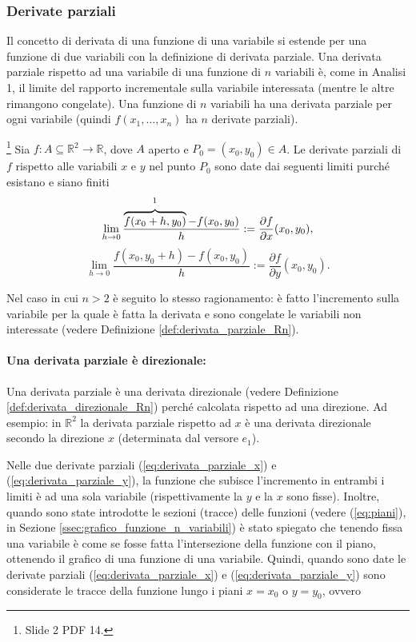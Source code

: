 \subsubsection{Derivate parziali}
Il concetto di derivata di una funzione di una variabile si estende per una funzione di due variabili con la definizione di derivata parziale. Una derivata parziale rispetto ad una variabile di una funzione di $n$ variabili è, come in Analisi 1, il limite del rapporto incrementale sulla variabile interessata (mentre le altre rimangono congelate). Una funzione di $n$ variabili ha una derivata parziale per ogni variabile (quindi $f(x_1,\hdots,x_n)$ ha $n$ derivate parziali).

\begin{definition}[Derivate parziali (caso $n=2$)]\footnote{Slide 2 PDF 14.}
    Sia $f:A\subseteq\mathbb R^2\rightarrow\mathbb R$, dove $A$ aperto e $P_0=(x_0,y_0)\in A$. Le derivate parziali di $f$ rispetto alle variabili $x$ e $y$ nel punto $P_0$ sono date dai seguenti limiti purché esistano e siano finiti
    \begin{equation}\label{eq:derivata_parziale_x}
        \lim\limits_{h\rightarrow 0}\frac{\overbrace{f(x_0+h, y_0)}^{\footnotemark}-f(x_0, y_0)}{h}:=\frac{\partial f}{\partial x}(x_0,y_0),
    \end{equation}
    \begin{equation}\label{eq:derivata_parziale_y}
        \lim\limits_{h\rightarrow 0}\frac{f(x_0, y_0+h)-f(x_0, y_0)}{h}:=\frac{\partial f}{\partial y}(x_0,y_0).
    \end{equation}
\end{definition}

Nel caso in cui $n>2$ è seguito lo stesso ragionamento: è fatto l'incremento sulla variabile per la quale è fatta la derivata e sono congelate le variabili non interessate (vedere Definizione \ref{def:derivata_parziale_Rn}).

\paragraph{Una derivata parziale è direzionale:} Una derivata parziale è una derivata direzionale (vedere Definizione \ref{def:derivata_direzionale_Rn}) perché calcolata rispetto ad una direzione. Ad esempio: in $\mathbb R^2$ la derivata parziale rispetto ad $x$ è una derivata direzionale secondo la direzione $x$ (determinata dal versore $e_1$).

Nelle due derivate parziali (\ref{eq:derivata_parziale_x}) e (\ref{eq:derivata_parziale_y}), la funzione che subisce l'incremento in entrambi i limiti è ad una sola variabile (rispettivamente la $y$ e la $x$ sono fisse). Inoltre, quando sono state introdotte le sezioni (tracce) delle funzioni (vedere (\ref{eq:piani}), in Sezione \ref{ssec:grafico_funzione_n_variabili}) è stato spiegato che tenendo fissa una variabile è come se fosse fatta l'intersezione della funzione con il piano, ottenendo il grafico di una funzione di una variabile. Quindi, quando sono date le derivate parziali (\ref{eq:derivata_parziale_x}) e (\ref{eq:derivata_parziale_y}) sono considerate le tracce della funzione lungo i piani $x=x_0$ o $y=y_0$, ovvero

